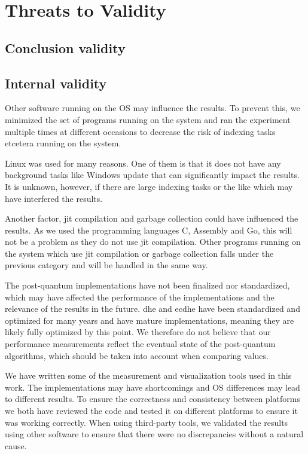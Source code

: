 \section{Threats to Validity}

\subsection{Conclusion validity}


\subsection{Internal validity}
\label{section:method:internal-validity}
Other software running on the OS may influence the results. To prevent this, we minimized the set of programs running on the system and ran the experiment multiple times at different occasions to decrease the risk of indexing tasks etcetera running on the system.

Linux was used for many reasons. One of them is that it does not have any background tasks like Windows update that can significantly impact the results. It is unknown, however, if there are large indexing tasks or the like which may have interfered the results.

Another factor, \gls{jit} compilation and garbage collection could have influenced the results. As we used the programming languages C, Assembly and Go, this will not be a problem as they do not use \gls{jit} compilation. Other programs running on the system which use \gls{jit} compilation or garbage collection falls under the previous category and will be handled in the same way.

The post-quantum implementations have not been finalized nor standardized, which may have affected the performance of the implementations and the relevance of the results in the future. \gls{dhe} and \gls{ecdhe} have been standardized and optimized for many years and have mature implementations, meaning they are likely fully optimized by this point. We therefore do not believe that our performance measurements reflect the eventual state of the \gls{post-quantum} algorithms, which should be taken into account when comparing values.

We have written some of the measurement and visualization tools used in this work. The implementations may have shortcomings and OS differences may lead to different results. To ensure the correctness and consistency between platforms we both have reviewed the code and tested it on different platforms to ensure it was working correctly. When using third-party tools, we validated the results using other software to ensure that there were no discrepancies without a natural cause.

